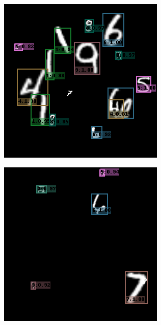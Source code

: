 \begin{figure}
  \centering
  \begin{subfigure}[b]{0.49\textwidth}
    \centering
    \includegraphics[width=\textwidth]{figures/6.png}
  \end{subfigure}
  \begin{subfigure}[b]{0.49\textwidth}
    \centering
    \includegraphics[width=\textwidth]{figures/7.png}

\end{subfigure}
\end{figure}
